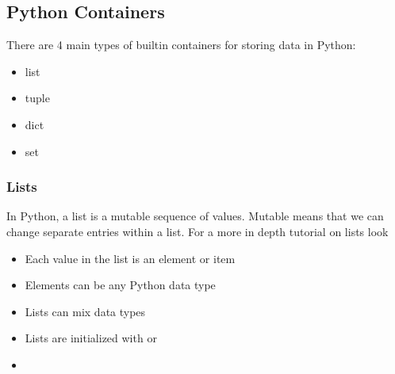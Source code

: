 \documentclass[letterpaper,10pt,english]{sphinxmanual}
\begin{document}
\subsection{Python Containers}
\label{\detokenize{content/Introduction_to_Programming:python-containers}}
There are 4 main types of builtin containers for storing data in Python:
\begin{itemize}
\item {} 
list

\item {} 
tuple

\item {} 
dict

\item {} 
set

\end{itemize}


\subsubsection{Lists}
\label{\detokenize{content/Introduction_to_Programming:lists}}
In Python, a list is a mutable sequence of values.  Mutable means that we can change separate entries within a list. For a more in depth tutorial on lists look 
\begin{itemize}
\item {} 
Each value in the list is an element or item

\item {} 
Elements can be any Python data type

\item {} 
Lists can mix data types

\item {} 
Lists are initialized with \sphinxcode{\sphinxupquote{{[}{]}}} or 

\end{itemize}

\begin{sphinxVerbatim}[commandchars=\\\{\}]
  \PYG{p}{[}\PYG{p}{]}
\end{sphinxVerbatim}
\begin{itemize}
\item {} 
\end{itemize}
\end{document}
